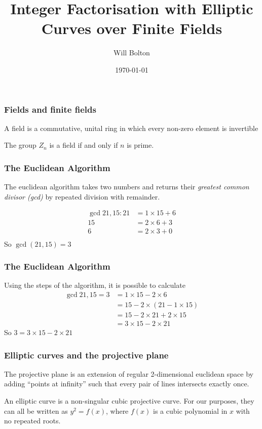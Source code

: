 \documentclass{beamer}
\title[Integer Factorisation with Elliptic Curves over Finite Fields]{Integer Factorisation with Elliptic Curves over Finite Fields}
\author{Will Bolton}
\date{\today}
\begin{document}
\titlepage %
\begin{frame} %
\frametitle{Fields and finite fields}
\begin{definition}
	A field is a commutative, unital ring in which every non-zero element is invertible
\end{definition}
\vfill
	The group $Z_n$ is a field if and only if $n$ is prime.
\end{frame}

\begin{frame} %
\frametitle{The Euclidean Algorithm}
\begin{definition}
	The euclidean algorithm takes two numbers and returns their \emph{greatest common divisor (gcd)} by repeated division with remainder.
\end{definition}
\begin{align*}
	\gcd{21,15}:21 &= 1\times15 + 6\\
	15 &= 2\times6 + 3\\
	6 &= 2\times3 + 0\\
\end{align*}
So $\gcd(21,15)=3$
\end{frame}

\begin{frame} %
\frametitle{The Euclidean Algorithm}
Using the steps of the algorithm, it is possible to calculate
\begin{align*}
	\gcd{21,15} = 3 &= 1\times15 - 2\times6\\
	&= 15 - 2\times(21 - 1\times15)\\
	&= 15 - 2\times21 + 2\times15\\
	&=3\times15 - 2\times21
\end{align*}
So $3 = 3\times15 - 2\times21$
\end{frame}

\begin{frame} %
\frametitle{Elliptic curves and the projective plane}
\begin{definition}
	The projective plane is an extension of regular 2-dimensional euclidean space by adding ``points at infinity'' such that every pair of lines intersects exactly once.
\end{definition}
\begin{definition}
	An elliptic curve is a non-singular cubic projective curve. For our purposes, they can all be written as $y^2 = f(x)$, where $f(x)$ is a cubic polynomial in $x$ with no repeated roots.
\end{definition}
\end{frame}
\end{document}
